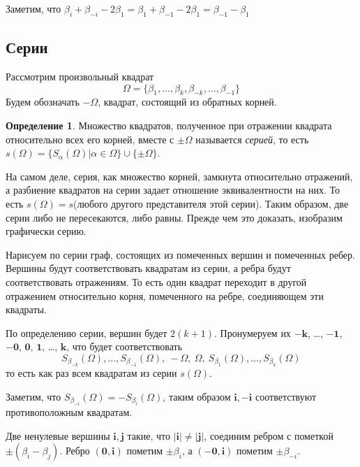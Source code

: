 \documentclass[a4paper,12pt]{amsart}
\theoremstyle{plain}
\theoremstyle{remark}
\theoremstyle{definition}
\newtheorem{definition}{Определение}
\begin{document}
Заметим, что $\beta_i + \beta_{-i} - 2\beta_1 = \beta_1 + \beta_{-1} - 2\beta_{1} = \beta_{-1} - \beta_{1}$


\subsection{Серии}
Рассмотрим произвольный квадрат $$\Omega = \{\beta_1, \ldots,\beta_k, \beta_{-k}, \ldots,\beta_{-1}\}$$
Будем обозначать $-\Omega$, квадрат, состоящий из обратных корней.
\begin{definition}
Множество квадратов, полученное при отражении квадрата относительно всех его корней, вместе с $\pm\Omega$ называется \emph{серией}, то есть $s(\Omega) = \{S_\alpha(\Omega) | \alpha\in\Omega\}\cup \{\pm\Omega\}$.
\end{definition}

На самом деле, серия, как множество корней, замкнута относительно отражений, а разбиение квадратов на серии задает отношение эквивалентности на них. То есть $s(\Omega)=s$(любого другого представителя этой серии). Таким образом, две серии либо не пересекаются, либо равны. Прежде чем это доказать, изобразим графически серию.

Нарисуем по серии граф, состоящих из помеченных вершин и помеченных ребер. Вершины будут соответствовать квадратам из серии, а ребра будут соответствовать отражениям. То есть один квадрат переходит в другой отражением относительно корня, помеченного на ребре, соединяющем эти квадраты.

По определению серии, вершин будет $2(k+1)$. Пронумеруем их $\mathbf{-k}$, \ldots, $\mathbf{-1}$, $\mathbf{-0}$, $\mathbf{0}$, $\mathbf{1}$, \ldots, $\mathbf{k}$, что будет соответствовать $$S_{\beta_{-k}}(\Omega), \ldots,S_{\beta_{-1}}(\Omega), ~-\Omega, ~\Omega, ~S_{\beta_{1}}(\Omega), \ldots,S_{\beta_{k}}(\Omega)$$
то есть как раз всем квадратам из серии $s(\Omega)$.

Заметим, что $S_{\beta_{-i}}(\Omega) = -S_{\beta_{i}}(\Omega)$, таким образом $\mathbf{i},\mathbf{-i}$ соответствуют противоположным квадратам.

Две ненулевые вершины $\mathbf{i}, \mathbf{j}$ такие, что $|\mathbf{i}| \neq |\mathbf{j}|$, соединим ребром с пометкой $\pm(\beta_{i}-\beta_{j})$.
Ребро $(\mathbf{0} , \mathbf{i})$ пометим $\pm\beta_{i}$, а $(\mathbf{-0}, \mathbf{i})$ пометим $\pm\beta_{-i}$.
\end{document}
